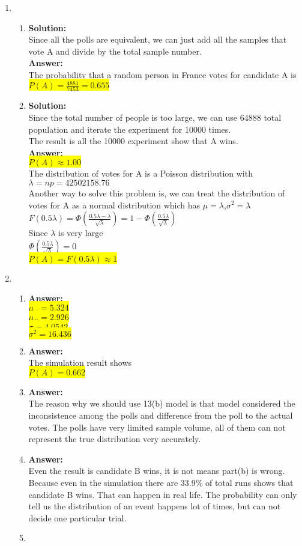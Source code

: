 \documentclass{article}
\newcommand{\myansw}{\textbf{Answer:}\\}
\newcommand{\mysolu}{\textbf{Solution:}\\}
\begin{document}
\begin{enumerate}
\begin{enumerate}
		
	\end{enumerate}
	\item
	\begin{enumerate}
		\item
		\mysolu
		Since all the polls are equivalent, we can just add all the samples that vote A and divide by the total sample number.\\
		\myansw
		The probability that a random person in France votes for candidate A is\\
		\colorbox{yellow}{$P(A) = \frac{4881}{7453}=0.655$}\\
		\item
		\mysolu
		Since the total number of people is too large, we can use 64888 total population and iterate the experiment for 10000 times.\\
		The result is all the 10000 experiment show that A wins.\\
		\myansw
		\colorbox{yellow}{$P(A) \approx 1.00$}\\
		The distribution of votes for A is a Poisson distribution with $\lambda = np = 42502158.76$\\
		Another way to solve this problem is, we can treat the distribution of votes for A as a normal distribution which has $\mu = \lambda$,$\sigma^2 = \lambda$ \\
		$F(0.5\lambda) = \Phi(\frac{0.5 \lambda - \lambda}{\sqrt{\lambda}}) = 1 - \Phi(\frac{0.5 \lambda}{\sqrt{\lambda}})$\\
		Since $\lambda$ is very large\\
		$\Phi(\frac{0.5 \lambda}{\sqrt{\lambda}})=0$\\
		\colorbox{yellow}{$P(A)=F(0.5\lambda) \approx 1$}\\
	\end{enumerate}
	\item
	\begin{enumerate}
		\item
		\myansw
		\colorbox{yellow}{$\mu_A = 5.324$}\\
		\colorbox{yellow}{$\mu_B = 2.926$}\\
		\colorbox{yellow}{$\sigma = 4.0542$}\\
		\colorbox{yellow}{$\sigma^2 = 16.436$}\\
		\item
		\myansw
		The simulation result shows\\
		\colorbox{yellow}{${P(A) = 0.662}$}\\
		\item
		\myansw
		The reason why we should use 13(b) model is that model considered the inconsistence among the polls and difference from the poll to the actual votes. The polls have very limited sample volume, all of them can not represent the true distribution very accurately.
		\item
		\myansw
		Even the result is candidate B wins, it is not means part(b) is wrong. Because even in the simulation there are 33.9\% of total runs shows that candidate B wins. That can happen in real life.
		The probability can only tell us the distribution of an event happens lot of times, but can not decide one particular trial.
		\item
		

\end{enumerate}
\end{enumerate}
\end{document}
